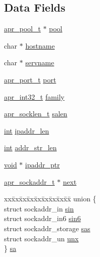 \subsection*{Data Fields}
\begin{DoxyCompactItemize}
\item 
\hyperlink{structapr__pool__t}{apr\+\_\+pool\+\_\+t} $\ast$ \hyperlink{structapr__sockaddr__t_a5f2d72a6a181cf2f54ba7c922aa0dfab}{pool}
\item 
char $\ast$ \hyperlink{structapr__sockaddr__t_a8e675775b407f25674aaa938a40de9cd}{hostname}
\item 
char $\ast$ \hyperlink{structapr__sockaddr__t_a668335161a8347b9a34c600bff80b52f}{servname}
\item 
\hyperlink{group__apr__network__io_gaa670a71960f6eb4fe0d0de2a1e7aba03}{apr\+\_\+port\+\_\+t} \hyperlink{structapr__sockaddr__t_a174c19138de9c208f13ed71b5892e505}{port}
\item 
\hyperlink{group__apr__platform_ga21ef1e35fd3ff9be386f3cb20164ff02}{apr\+\_\+int32\+\_\+t} \hyperlink{structapr__sockaddr__t_ac17f6e803928cfc29069a6e62dcb3a52}{family}
\item 
\hyperlink{group__apr__platform_gab613b0701b7a8b0ccd1a3c157a800f27}{apr\+\_\+socklen\+\_\+t} \hyperlink{structapr__sockaddr__t_aef1d2a482f85eeab7b6bf0a7732a087a}{salen}
\item 
\hyperlink{pcre_8txt_a42dfa4ff673c82d8efe7144098fbc198}{int} \hyperlink{structapr__sockaddr__t_a81be21b2eb968b83ca36183213c99867}{ipaddr\+\_\+len}
\item 
\hyperlink{pcre_8txt_a42dfa4ff673c82d8efe7144098fbc198}{int} \hyperlink{structapr__sockaddr__t_a8f7cda5562e904a1398ed5a4a6f0a9d9}{addr\+\_\+str\+\_\+len}
\item 
\hyperlink{group__MOD__ISAPI_gacd6cdbf73df3d9eed42fa493d9b621a6}{void} $\ast$ \hyperlink{structapr__sockaddr__t_a6e1b71121ada4047acde36c6777b5442}{ipaddr\+\_\+ptr}
\item 
\hyperlink{structapr__sockaddr__t}{apr\+\_\+sockaddr\+\_\+t} $\ast$ \hyperlink{structapr__sockaddr__t_a774835c6b8e3adf255b752e8b126c434}{next}
\item 
\begin{tabbing}
xx\=xx\=xx\=xx\=xx\=xx\=xx\=xx\=xx\=\kill
union \{\\
\>struct sockaddr\_in \hyperlink{structapr__sockaddr__t_a7d5cf0290260c3c448360fc819b28714}{sin}\\
\>struct sockaddr\_in6 \hyperlink{structapr__sockaddr__t_ab3a1f900d2a1e58d337a61d99e94d3f9}{sin6}\\
\>struct sockaddr\_storage \hyperlink{structapr__sockaddr__t_ac823daa30be02ee1589b4b67615cef5f}{sas}\\
\>struct sockaddr\_un \hyperlink{structapr__sockaddr__t_ab70adff74895539a7e6cc9cba74c2673}{unx}\\
\} \hyperlink{structapr__sockaddr__t_ade95595a2a33c108f71358bbb8a501cf}{sa}\\

\end{tabbing}\end{DoxyCompactItemize}


